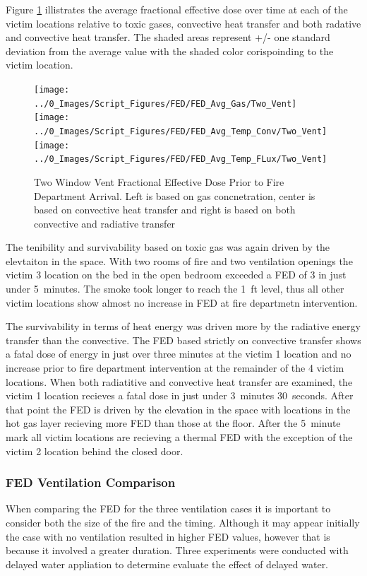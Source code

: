 \documentclass[12pt,oneside]{book}
\begin{document}
Figure \ref{fig:FED_TwoVent} illistrates the average fractional effective dose over time at each of the victim locations relative to toxic gases, convective heat transfer and both radative and convective heat transfer. The shaded areas represent +/- one standard deviation from the average value with the shaded color corispoinding to the victim location. 

\begin{figure}[H]
	\centering
	\texttt{[image: ../0\_Images/Script\_Figures/FED/FED\_Avg\_Gas/Two\_Vent]}
	\texttt{[image: ../0\_Images/Script\_Figures/FED/FED\_Avg\_Temp\_Conv/Two\_Vent]} 
	\texttt{[image: ../0\_Images/Script\_Figures/FED/FED\_Avg\_Temp\_FLux/Two\_Vent]}
	\caption[Two Window Vent Fractional Effective Dose]{Two Window Vent Fractional Effective Dose Prior to Fire Department Arrival. Left is based on gas concnetration, center is based on convective heat transfer and right is based on both convective and radiative transfer}
	\label{fig:FED_TwoVent}
\end{figure}

The tenibility and survivability based on toxic gas was again driven by the elevtaiton in the space. With two rooms of fire and two ventilation openings the victim 3 location on the bed in the open bedroom exceeded a FED of 3 in just under 5~minutes. The smoke took longer to reach the 1~ft level, thus all other victim locations show almost no increase in FED at fire departmetn intervention.

The survivability in terms of heat energy was driven more by the radiative energy transfer than the convective. The FED based strictly on convective transfer shows a fatal dose of energy in just over three minutes at the victim 1 location and no increase prior to fire department intervention at the remainder of the 4 victim locations. When both radiatitive and convective heat transfer are examined, the victim 1 location recieves a fatal dose in just under 3~minutes 30~seconds. After that point the FED is driven by the elevation in the space with locations in the hot gas layer recieving more FED than those at the floor. After the 5~minute mark all victim locations are recieving a thermal FED with the exception of the victim 2 location behind the closed door.  

\subsubsection{FED Ventilation Comparison}
When comparing the FED for the three ventilation cases it is important to consider both the size of the fire and the timing. Although it may appear initially the case with no ventilation resulted in higher FED values, however that is because it involved a greater duration. Three experiments were conducted with delayed water appliation to determine evaluate the effect of delayed water. 
\end{document}
